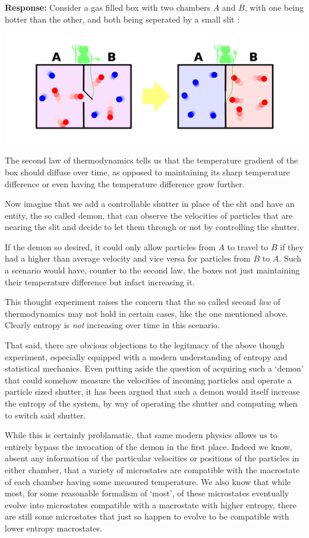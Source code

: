 \documentclass{article}
\begin{document}
\noindent\textbf{Response:} Consider a gas filled box with two chambers $A$ and $B$, with one being hotter than the other, and both being seperated by a small slit \cite{demon pic}:

\includegraphics[width=\linewidth]{mdemon.png}

The second law of thermodynamics tells us that the temperature gradient of the box should diffuse over time, as opposed to maintaining its sharp temperature difference or even having the temperature difference grow further.

Now imagine that we add a controllable shutter in place of the slit and have an entity, the so called demon, that can observe the velocities of particles that are nearing the slit and decide to let them through or not by controlling the shutter.

If the demon so desired, it could only allow particles from $A$ to travel to $B$ if they had a higher than average velocity and vice versa for particles from $B$ to $A$. Such a scenario would have, counter to the second law, the boxes not just maintaining their temperature difference but infact increasing it.

This thought experiment raises the concern that the so called second \textit{law} of thermodynamics may not hold in certain cases, like the one mentioned above. Clearly entropy is \textit{not} increasing over time in this scenario.

That said, there are obvious objections to the legitmacy of the above though experiment, especially equipped with a modern understanding of entropy and statistical mechanics. Even putting aside the question of acquiring such a `demon' that could somehow measure the velocities of incoming particles and operate a particle sized shutter, it has been argued that such a demon would itself increase the entropy of the system, by way of operating the shutter and computing when to switch said shutter.

While this is certainly problamatic, that same modern physics allows us to entirely bypass the invocation of the demon in the first place. Indeed we know, absent any information of the particular velocities or positions of the particles in either chamber, that a variety of microstates are compatible with the macrostate of each chamber having some measured temperature. We also know that while most, for some reasonable formalism of `most', of these microstates eventually evolve into microstates compatible with a macrostate with higher entropy, there are still some microstates that just so happen to evolve to be compatible with lower entropy macrostates.
\end{document}
